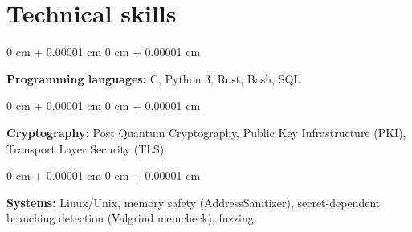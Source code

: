 \documentclass[10pt, letterpaper]{article}
\newenvironment{onecolentry}{
    \begin{adjustwidth}{
        0 cm + 0.00001 cm
    }{
        0 cm + 0.00001 cm
    }
}{
    \end{adjustwidth}
} %
\begin{document}
    \section{Technical skills}
        \begin{onecolentry}
            \textbf{Programming languages:} C, Python 3, Rust, Bash, SQL
        \end{onecolentry}
        \vspace{0.1 cm}
        \begin{onecolentry}
            \textbf{Cryptography:} Post Quantum Cryptography, Public Key Infrastructure (PKI), Transport Layer Security (TLS)
        \end{onecolentry}
        \vspace{0.1 cm}
        \begin{onecolentry}
            \textbf{Systems:} Linux/Unix, memory safety (AddressSanitizer), secret-dependent branching detection (Valgrind memcheck), fuzzing
        \end{onecolentry}
\end{document}
